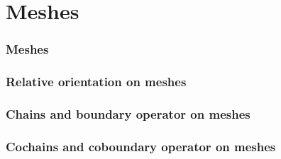\documentclass{article}
\theoremstyle{definition}
\begin{document}
\part{Meshes}

\section{Meshes}
\label{section:meshes}


\section{Relative orientation on meshes}
\label{section:relative_orientation_on_meshes}





\section{Chains and boundary operator on meshes}
\label{section:chains_and_boundary_operator_on_meshes}








\section{Cochains and coboundary operator on meshes}
\label{section:cochains_and_coboundary_operator_on_meshes}




\end{document}

